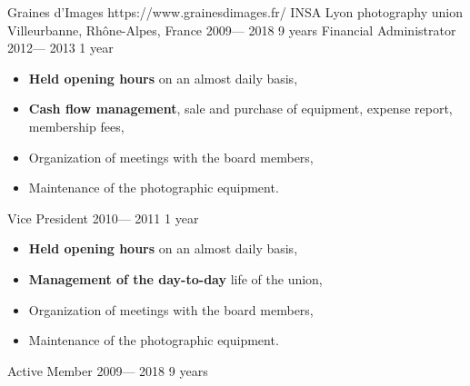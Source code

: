 \volunteerorganization%
{Graines d'Images}%
{https://www.grainesdimages.fr/}%
{INSA Lyon photography union}%
{Villeurbanne, Rhône-Alpes, France}%
{2009--- 2018}%
{9 years}
\volunteerposition%
{Financial Administrator}%
{2012--- 2013}%
{1 year}%
{
	\begin{itemize}
    \item \textbf{Held opening hours} on an almost daily basis,
    \item \textbf{Cash flow management}, sale and purchase of equipment, expense report,
      membership fees,
    \item Organization of meetings with the board members,
    \item Maintenance of the photographic equipment.
	\end{itemize}
}%
\volunteerposition%
{Vice President}%
{2010--- 2011}%
{1 year}%
{
	\begin{itemize}
    \item \textbf{Held opening hours} on an almost daily basis,
    \item \textbf{Management of the day-to-day} life of the union,
    \item Organization of meetings with the board members,
    \item Maintenance of the photographic equipment.
	\end{itemize}
}%
\volunteerposition%
{Active Member}%
{2009--- 2018}%
{9 years}%
{}%
